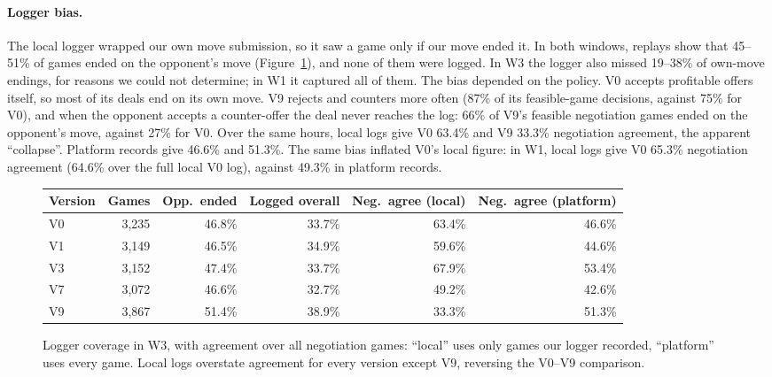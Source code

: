 \documentclass{article}
\begin{document}
\paragraph{Logger bias.}
The local logger wrapped our own move submission, so it saw a game only if our move ended it. In both windows, replays show that 45--51\% of games ended on the opponent's move (Figure~\ref{fig:coverage}), and none of them were logged. In W3 the logger also missed 19--38\% of own-move endings, for reasons we could not determine; in W1 it captured all of them. The bias depended on the policy. V0 accepts profitable offers itself, so most of its deals end on its own move. V9 rejects and counters more often (87\% of its feasible-game decisions, against 75\% for V0), and when the opponent accepts a counter-offer the deal never reaches the log: 66\% of V9's feasible negotiation games ended on the opponent's move, against 27\% for V0. Over the same hours, local logs give V0 63.4\% and V9 33.3\% negotiation agreement, the apparent ``collapse''. Platform records give 46.6\% and 51.3\%. The same bias inflated V0's local figure: in W1, local logs give V0 65.3\% negotiation agreement (64.6\% over the full local V0 log), against 49.3\% in platform records.

\begin{figure}[!t]
\centering
\small
\begin{tabular}{lrrrrr}
\toprule
Version & Games & Opp.\ ended & Logged overall & Neg.\ agree (local) & Neg.\ agree (platform) \\
\midrule
V0 & 3{,}235 & 46.8\% & 33.7\% & 63.4\% & 46.6\% \\
V1 & 3{,}149 & 46.5\% & 34.9\% & 59.6\% & 44.6\% \\
V3 & 3{,}152 & 47.4\% & 33.7\% & 67.9\% & 53.4\% \\
V7 & 3{,}072 & 46.6\% & 32.7\% & 49.2\% & 42.6\% \\
V9 & 3{,}867 & 51.4\% & 38.9\% & 33.3\% & 51.3\% \\
\bottomrule
\end{tabular}
\caption{Logger coverage in W3, with agreement over all negotiation games: ``local'' uses only games our logger recorded, ``platform'' uses every game. Local logs overstate agreement for every version except V9, reversing the V0--V9 comparison.}
\label{fig:coverage}
\end{figure}
\end{document}
